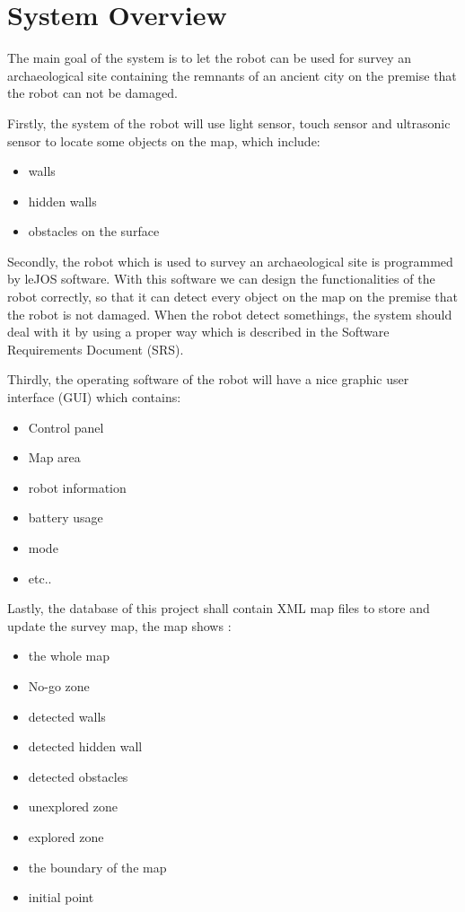 \documentclass[11pt, a4paper]{report}
\begin{document}
\chapter{System Overview}%
\label{cha:SO}
The main goal of the system is to let the robot can be used for survey an archaeological site containing the remnants of an ancient city on the premise that the robot can not be damaged.
\par\vspace{\baselineskip}
\par\vspace{\baselineskip}
 Firstly, the system of the robot will use light sensor, touch sensor and ultrasonic sensor to locate some objects on the map, which include:
\begin{itemize}
  \item walls
  \item hidden walls
  \item obstacles on the surface
\end{itemize}
Secondly, the robot which is used to survey an archaeological site is programmed by leJOS software. With this software we can design the functionalities of the robot correctly, so that it can detect every object on the map on the premise that the robot is not damaged. When the robot detect somethings, the system should deal with it by using a proper way which is described in the Software Requirements Document (SRS).
\par\vspace{\baselineskip}
\par\vspace{\baselineskip}
Thirdly, the operating software of the robot will have a nice graphic user interface (GUI) which contains:
\begin{itemize}
  \item Control panel
  \item Map area
  \item robot information
  \item battery usage
  \item mode
  \item etc..
\end{itemize}
Lastly, the database of this project shall contain XML map files to store and update the survey map, the map shows :
\begin{itemize}
  \item the whole map
  \item No-go zone
  \item detected walls
  \item detected hidden wall
  \item detected obstacles
  \item unexplored zone
  \item explored zone
  \item the boundary of the map
  \item initial point
\end{itemize}
\end{document}
